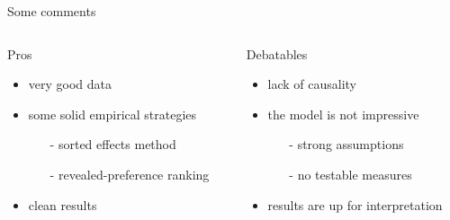 \begin{frame}{Some comments}

    \begin{columns}[T]
        \begin{column}{0.45\textwidth}
            \begin{block}{Pros}
                \begin{itemize}
                    \item very good data
                    \item some solid empirical strategies
                    \begin{itemize}
                        \item[-] sorted effects method 
                        \item[-] revealed-preference ranking
                    \end{itemize} 
                    \item clean results
                \end{itemize}
            \end{block}
        \end{column}

        \begin{column}{0.45\textwidth}
            \begin{block}{Debatables}
                \begin{itemize}
                    \item lack of causality
                    \item the model is not impressive
                    \begin{itemize}
                        \item[-] strong assumptions
                        \item[-] no testable measures
                    \end{itemize}
                    \item results are up for interpretation
                \end{itemize}
            \end{block}
        \end{column}
    \end{columns}
\end{frame}